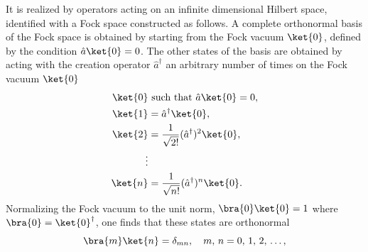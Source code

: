 It is realized by operators acting on an infinite dimensional Hilbert space, identified with a Fock space constructed as follows. A complete orthonormal basis of the Fock space is obtained by starting from the Fock vacuum \(\ket{0}\), defined by the condition \(\hat{a} \ket{0} = 0\). The other states of the basis are obtained by acting with the creation operator \(\hat{a}^\dagger\) an arbitrary number of times on the Fock vacuum \(\ket{0}\)
\[
    \begin{aligned}
        \ket{0} & \text{ such that } \hat{a} \ket{0} = 0,            \\
        \ket{1} & = \hat{a}^\dagger \ket{0},                         \\
        \ket{2} & = \frac{1}{\sqrt{2!}} (\hat{a}^\dagger)^2 \ket{0}, \\
        \vdots  &                                                    \\
        \ket{n} & = \frac{1}{\sqrt{n!}} (\hat{a}^\dagger)^n \ket{0}.
    \end{aligned}
\]
Normalizing the Fock vacuum to the unit norm, \(\bra{0}\ket{0} = 1\) where \(\bra{0} = \ket{0}^\dagger\), one finds that these states are orthonormal
\[
    \bra{m}\ket{n} = \delta_{mn}, \quad m,\,n = 0,\,1,\,2,\,\dots,
\]

